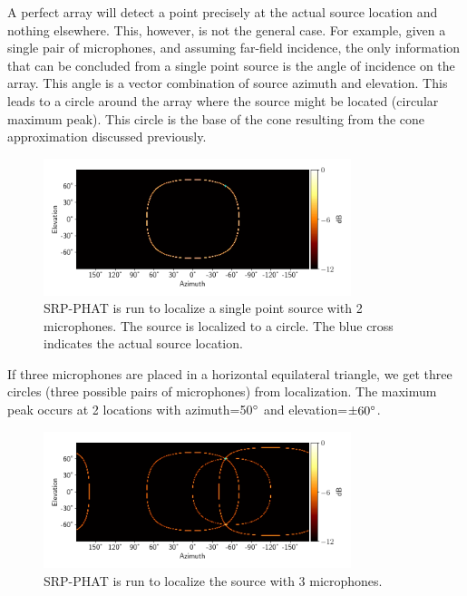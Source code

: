 A perfect array will detect a point precisely at the actual source location and nothing elsewhere. This, however, is not the general case. For example, given a single pair of microphones, and assuming far-field incidence, the only information that can be concluded from a single point source is the angle of incidence on the array. This angle is a vector combination of source azimuth and elevation. This leads to a circle around the array where the source might be located (circular maximum peak). This circle is the base of the cone resulting from the cone approximation discussed previously.
\begin{figure}[H]
    \centering
    \includegraphics[width=0.8\textwidth]{Figures/2mic1srcRes.png}
    \caption{SRP-PHAT is run to localize a single point source with 2 microphones. The source is localized to a circle. The blue cross indicates the actual source location.}
    \label{fig:2mic1src}
\end{figure}
If three microphones are placed in a horizontal equilateral triangle, we get three circles (three possible pairs of microphones) from localization. The maximum peak occurs at 2 locations with azimuth=50$\degree$ and elevation=$\pm 60\degree$.
\begin{figure}[H]
    \centering
    \includegraphics[width=0.8\textwidth]{Figures/3mic1srcRes.png}
    \caption{SRP-PHAT is run to localize the source with 3 microphones.}
    \label{fig:3mic1src}
\end{figure}
